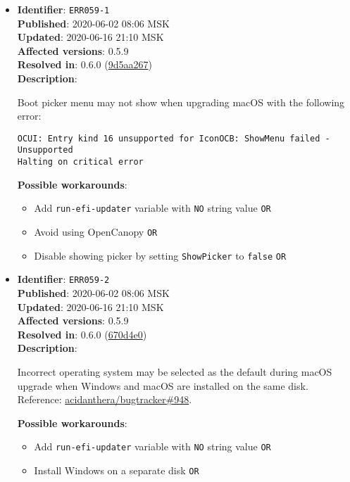 \documentclass[]{article}
\providecommand{\tightlist}{%
  \setlength{\itemsep}{0pt}\setlength{\parskip}{0pt}}
\begin{document}
\begin{itemize}
\item
  \textbf{Identifier}: \texttt{ERR059-1} \\
  \textbf{Published}: 2020-06-02 08:06 MSK \\
  \textbf{Updated}: 2020-06-16 21:10 MSK \\
  \textbf{Affected versions}: 0.5.9 \\
  \textbf{Resolved in}: 0.6.0 (\href{https://github.com/acidanthera/OpenCorePkg/commit/9d5aa267a9133fd9390b62012c21428fc77681f2}{9d5aa267}) \\
  \textbf{Description}:

  Boot picker menu may not show when upgrading macOS with the following error:

\texttt{OCUI﻿: Ent﻿ry kind 16 unsupported for Icon﻿OCB: ShowMenu failed - Unsupported﻿﻿}\\
\texttt{Halting on critical error﻿}

  \textbf{Possible workarounds}:
  \begin{itemize}
    \tightlist
    \item Add \texttt{run-efi-updater} variable with \texttt{NO} string value \texttt{OR}
    \item Avoid using OpenCanopy \texttt{OR}
    \item Disable showing picker by setting \texttt{ShowPicker} to \texttt{false} \texttt{OR}
  \end{itemize}
\item
  \textbf{Identifier}: \texttt{ERR059-2} \\
  \textbf{Published}: 2020-06-02 08:06 MSK \\
  \textbf{Updated}: 2020-06-16 21:10 MSK \\
  \textbf{Affected versions}: 0.5.9 \\
  \textbf{Resolved in}: 0.6.0 (\href{https://github.com/acidanthera/OpenCorePkg/commit/670d4e0c4f8538268367d16fc3ddef9b2ed13d46}{670d4e0}) \\
  \textbf{Description}:

  Incorrect operating system may be selected as the default during macOS upgrade when
  Windows and macOS are installed on the same disk. Reference:
  \href{https://github.com/acidanthera/bugtracker/issues/948}{acidanthera/bugtracker\#948}.

  \textbf{Possible workarounds}:
  \begin{itemize}
    \tightlist
    \item Add \texttt{run-efi-updater} variable with \texttt{NO} string value \texttt{OR}
    \item Install Windows on a separate disk \texttt{OR}
  \end{itemize}
\end{itemize}
\end{document}
